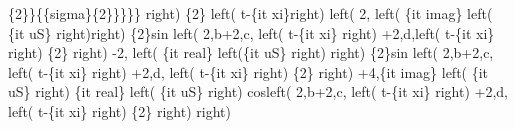 \begin{maplegroup}
\{2\}\}\{\{sigma\}\{2\}\}\}\}\} right) \{2\} left( t-\{it xi\}right)  left( 2, left( \{it imag\} left( \{it uS\} right)right) \{2\}sin left( 2,b+2,c, left( t-\{it xi\} right) +2,d,left( t-\{it xi\} right) \{2\} right) -2, left( \{it real\} left(\{it uS\} right)  right) \{2\}sin left( 2,b+2,c, left( t-\{it xi\} right) +2,d, left( t-\{it xi\} right) \{2\} right) +4,\{it imag\} left( \{it uS\} right) \{it real\} left( \{it uS\} right) cosleft( 2,b+2,c, left( t-\{it xi\} right) +2,d, left( t-\{it xi\} right) \{2\} right)  right)\end{maplegroup}

